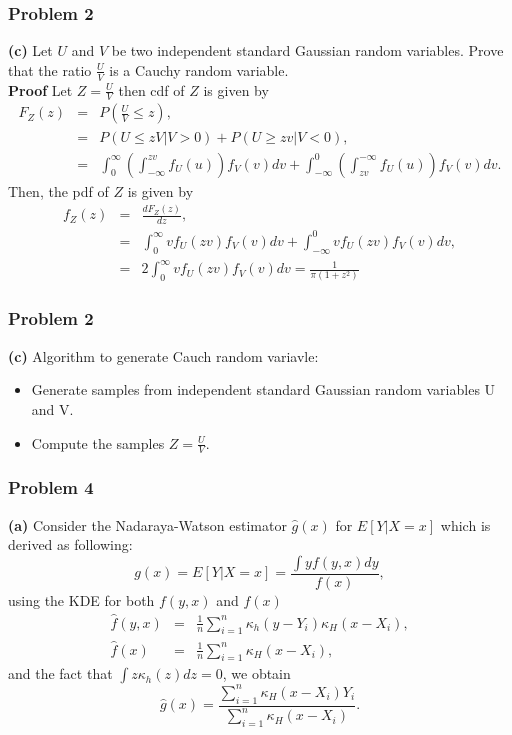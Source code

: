 \documentclass[10]{beamer}
\begin{document}
\begin{frame}
\frametitle{Problem 2}
\textbf{(c)} Let $U$ and $V$ be two independent standard Gaussian random variables. Prove that the ratio $\frac{U}{V}$ is a Cauchy random variable.\\
\textbf{Proof}
\vspace{0.02in}
Let $Z = \frac{U}{V}$ then cdf of $Z$ is given by
\begin{eqnarray*}
F_{Z}(z) &=& P(\frac{U}{V} \leq z), \\
&=& P(U \leq zV | V>0) + P(U \geq zv | V < 0), \\
&=& \int_{0}^{\infty} \left( \int_{-\infty}^{zv} f_{U}(u) \right) f_{V}(v) dv + \int_{-\infty}^{0} \left( \int_{zv}^{-\infty} f_{U}(u) \right) f_{V}(v) dv.
\end{eqnarray*}
Then, the pdf of $Z$ is given by
\begin{eqnarray*}
f_{Z}(z) &=& \frac{dF_{Z}(z)}{dz}, \\
&=& \int_{0}^{\infty} v f_{U}(zv) f_{V}(v) dv + \int_{-\infty}^{0} v f_{U}(zv) f_{V}(v) dv, \\
&=& 2 \int_{0}^{\infty} v f_{U}(zv) f_{V}(v) dv = \frac{1}{\pi(1+z^2)}
\end{eqnarray*}
\end{frame}

\begin{frame}
\frametitle{Problem 2}
\textbf{(c)} Algorithm to generate Cauch random variavle:\\
\begin{itemize}
\item Generate samples from independent standard Gaussian random variables U and V.
\item Compute the samples $Z = \frac{U}{V}$.
\end{itemize}
\end{frame}

\begin{frame}
\frametitle{Problem 4}
\textbf{(a)} Consider the Nadaraya-Watson estimator $\hat{g}(x)$ for $E[Y|X=x]$ which is derived as following:
\begin{equation*}
g(x) = E[Y|X=x] = \frac{\int y f(y,x) dy}{f(x)},
\end{equation*}
using the KDE for both $f(y,x)$ and $f(x)$
\begin{eqnarray*}
\hat{f}(y,x) &=& \frac{1}{n} \sum_{i = 1}^{n} \kappa_{h}(y - Y_i) \kappa_{H}(x - X_i), \\
\hat{f}(x) &=& \frac{1}{n} \sum_{i = 1}^{n} \kappa_{H}(x - X_i),
\end{eqnarray*}
and the fact that $\int z\kappa_{h} (z)dz = 0$, we obtain
\begin{equation*}
\hat{g}(x) = \frac{ \sum_{i = 1}^{n}\kappa_{H}(x - X_i) Y_{i}}{\sum_{i = 1}^{n} \kappa_{H}(x - X_i)}.
\end{equation*}
\end{frame}
\end{document}
